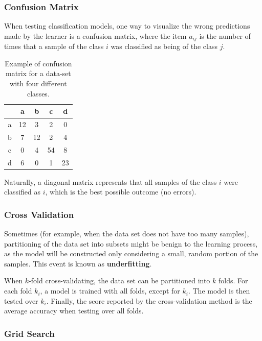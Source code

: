 \documentclass[12pt]{report}
\begin{document}
\subsubsection{Confusion Matrix}

When testing classification models, one way to visualize the wrong predictions made by the learner is a confusion matrix, where the item $a_{ij}$ is the number of times that a sample of the class $i$ was classified as being of the class $j$.

\begin{table}[H]
	\centering
	\begin{tabular}{ |c || *{4}{c|} }
		\hline
           &   a &   b &   c &   d \\\hline\hline
		a & 12 &   3 &   2 &   0 \\
		b &   7 & 12 &   2 &   4 \\
		c &   0 &   4 & 54 &   8 \\
		d &   6 &   0 &   1 & 23 \\\hline
	\end{tabular}

	\caption{Example of confusion matrix for a data-set with four different classes.}
\end{table}

Naturally, a diagonal matrix represents that all samples of the class $i$ were classified as $i$, which is the best possible outcome (no errors).

\subsubsection{Cross Validation}

Sometimes (for example, when the data set does not have too many samples), partitioning of the data set into subsets might be benign to the learning process, as the model will be constructed only considering a small, random portion of the samples. This event is known as \textbf{underfitting}.

When $k$-fold cross-validating, \cite{crossvalid} the data set can be partitioned into $k$ folds. For each fold $k_i$, a model is trained with all folds, except for $k_i$. The model is then tested over $k_i$. Finally, the score reported by the cross-validation method is the average accuracy when testing over all folds.

\subsubsection{Grid Search}
\end{document}
